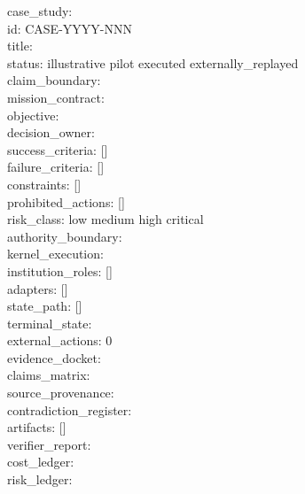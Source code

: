 \begingroup\small\ttfamily\raggedright\setlength{\emergencystretch}{4em}
case\_\allowbreak{}study:\\
id: CASE-YYYY-NNN\\
title: \textquotesingle\textquotesingle{}\\
status:
illustrative\textbar{}\allowbreak{} pilot\textbar{}\allowbreak{} executed\textbar{}\allowbreak{} externally\_\allowbreak{}replayed\\
claim\_\allowbreak{}boundary: \textquotesingle\textquotesingle{}\\
mission\_\allowbreak{}contract:\\
objective: \textquotesingle\textquotesingle{}\\
decision\_\allowbreak{}owner: \textquotesingle\textquotesingle{}\\
success\_\allowbreak{}criteria: {[}{]}\\
failure\_\allowbreak{}criteria: {[}{]}\\
constraints: {[}{]}\\
prohibited\_\allowbreak{}actions: {[}{]}\\
risk\_\allowbreak{}class: low\textbar{}\allowbreak{} medium\textbar{}\allowbreak{} high\textbar{}\allowbreak{} critical\\
authority\_\allowbreak{}boundary: \textquotesingle\textquotesingle{}\\
kernel\_\allowbreak{}execution:\\
institution\_\allowbreak{}roles: {[}{]}\\
adapters: {[}{]}\\
state\_\allowbreak{}path: {[}{]}\\
terminal\_\allowbreak{}state: \textquotesingle\textquotesingle{}\\
external\_\allowbreak{}actions: 0\\
evidence\_\allowbreak{}docket:\\
claims\_\allowbreak{}matrix: \textquotesingle\textquotesingle{}\\
source\_\allowbreak{}provenance: \textquotesingle\textquotesingle{}\\
contradiction\_\allowbreak{}register: \textquotesingle\textquotesingle{}\\
artifacts: {[}{]}\\
verifier\_\allowbreak{}report: \textquotesingle\textquotesingle{}\\
cost\_\allowbreak{}ledger: \textquotesingle\textquotesingle{}\\
risk\_\allowbreak{}ledger: \textquotesingle\textquotesingle{}\\
